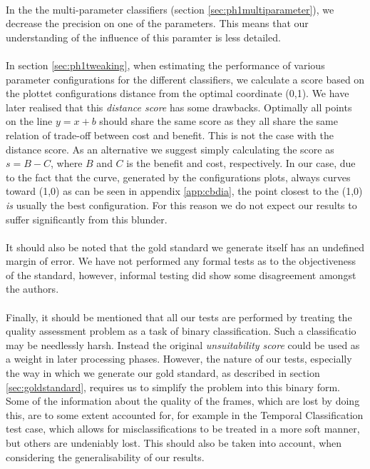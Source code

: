 \\
In the the multi-parameter classifiers (section \ref{sec:ph1multiparameter}), we decrease the precision on one of the parameters. This means that our understanding of the influence of this paramter is less detailed.\\
\\
In section \ref{sec:ph1tweaking}, when estimating the performance of various parameter configurations for the different classifiers, we calculate a score based on the plottet configurations distance from the optimal coordinate (0,1). We have later realised that this \textit{distance score} has some drawbacks. Optimally all points on the line $y = x + b$ should share the same score as they all share the same relation of trade-off between cost and benefit. This is not the case with the distance score. As an alternative we suggest simply calculating the score as $s = B - C$, where $B$ and $C$ is the benefit and cost, respectively. In our case, due to the fact that the curve, generated by the configurations plots, always curves toward (1,0) as can be seen in appendix \ref{app:cbdia}, the point closest to the (1,0) \textit{is} usually the best configuration. For this reason we do not expect our results to suffer significantly from this blunder.\\
\\
It should also be noted that the gold standard we generate itself has an undefined margin of error. We have not performed any formal tests as to the objectiveness of the standard, however, informal testing did show some disagreement amongst the authors.\\
\\
Finally, it should be mentioned that all our tests are performed by treating the quality assessment problem as a task of binary classification. Such a classificatio may be needlessly harsh. Instead the original \textit{unsuitability score} could be used as a weight in later processing phases. However, the nature of our tests, especially the way in which we generate our gold standard, as described in section \ref{sec:goldstandard}, requires us to simplify the problem into this binary form. Some of the information about the quality of the frames, which are lost by doing this, are to some extent accounted for, for example in the Temporal Classification test case, which allows for misclassifications to be treated in a more soft manner, but others are undeniably lost. This should also be taken into account, when considering the generalisability of our results.
%
